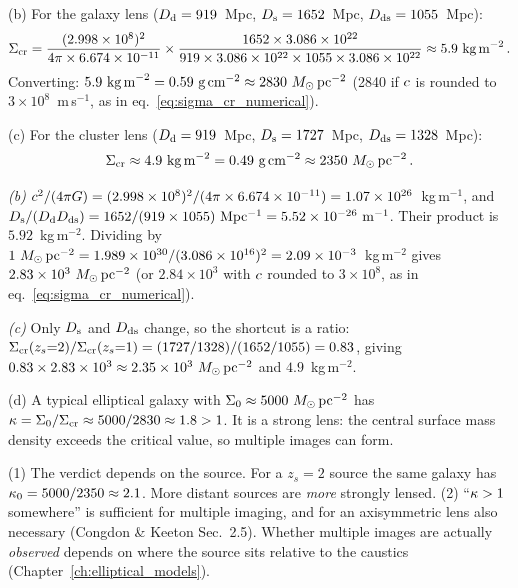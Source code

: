 (b) For the galaxy lens ($D_{\mathrm{d}} = 919$~Mpc, $D_{\mathrm{s}} = 1652$~Mpc,
$D_{\mathrm{ds}} = 1055$~Mpc):
\begin{equation*}
    \Sigma_{\mathrm{cr}} = \frac{(2.998 \times 10^{8})^2}{4\pi \times
    6.674 \times 10^{-11}} \times
    \frac{1652 \times 3.086 \times 10^{22}}{919 \times 3.086 \times 10^{22}
    \times 1055 \times 3.086 \times 10^{22}}
    \approx 5.9~\text{kg\,m}^{-2} \,.
\end{equation*}
Converting: $5.9~\text{kg\,m}^{-2} = 0.59~\text{g\,cm}^{-2}
\approx 2830~M_{\odot}\,\text{pc}^{-2}$ (2840 if $c$ is rounded to
$3\times10^{8}$~m\,s$^{-1}$, as in eq.~\eqref{eq:sigma_cr_numerical}).

(c) For the cluster lens ($D_{\mathrm{d}} = 919$~Mpc, $D_{\mathrm{s}} = 1727$~Mpc,
$D_{\mathrm{ds}} = 1328$~Mpc):
\begin{equation*}
    \Sigma_{\mathrm{cr}} \approx 4.9~\text{kg\,m}^{-2} = 0.49~\text{g\,cm}^{-2}
    \approx 2350~M_{\odot}\,\text{pc}^{-2} \,.
\end{equation*}
\begin{derivation}
\emph{(b)} $c^2/(4\pi G) = (2.998\times10^{8})^2/(4\pi\times6.674\times10^{-11})
= 1.07\times10^{26}$~kg\,m$^{-1}$, and
$D_{\mathrm{s}}/(D_{\mathrm{d}}D_{\mathrm{ds}}) = 1652/(919\times1055)~\mathrm{Mpc^{-1}} = 5.52\times10^{-26}~\mathrm{m^{-1}}$.
Their product is $5.92$~kg\,m$^{-2}$. Dividing by
$1~M_{\odot}\,\mathrm{pc^{-2}} = 1.989\times10^{30}/(3.086\times10^{16})^2 = 2.09\times10^{-3}$~kg\,m$^{-2}$
gives $2.83\times10^{3}~M_{\odot}\,\mathrm{pc^{-2}}$ (or $2.84\times10^{3}$ with
$c$ rounded to $3\times10^{8}$, as in eq.~\eqref{eq:sigma_cr_numerical}).

\emph{(c)} Only $D_{\mathrm{s}}$ and $D_{\mathrm{ds}}$ change, so the shortcut is a ratio:
$\Sigma_{\mathrm{cr}}(z_s{=}2)/\Sigma_{\mathrm{cr}}(z_s{=}1) = (1727/1328)/(1652/1055) = 0.83$, giving
$0.83\times2.83\times10^{3} \approx 2.35\times10^{3}~M_{\odot}\,\mathrm{pc^{-2}}$ and
$4.9$~kg\,m$^{-2}$.
\end{derivation}

(d) A typical elliptical galaxy with
$\Sigma_0 \approx 5000~M_{\odot}\,\text{pc}^{-2}$ has
$\kappa = \Sigma_0/\Sigma_{\mathrm{cr}} \approx 5000/2830 \approx 1.8 > 1$.
It is a strong lens: the central surface mass density exceeds
the critical value, so multiple images can form.
\begin{annotation}
(1) The verdict depends on the source. For a $z_s = 2$ source the same galaxy
has $\kappa_0 = 5000/2350 \approx 2.1$. More distant sources are
\emph{more} strongly lensed. (2) ``$\kappa > 1$ somewhere'' is sufficient for
multiple imaging, and for an axisymmetric lens also necessary (Congdon \& Keeton Sec.~2.5).
Whether multiple images are actually \emph{observed} depends on where the source sits
relative to the caustics (Chapter~\ref{ch:elliptical_models}).
\end{annotation}

